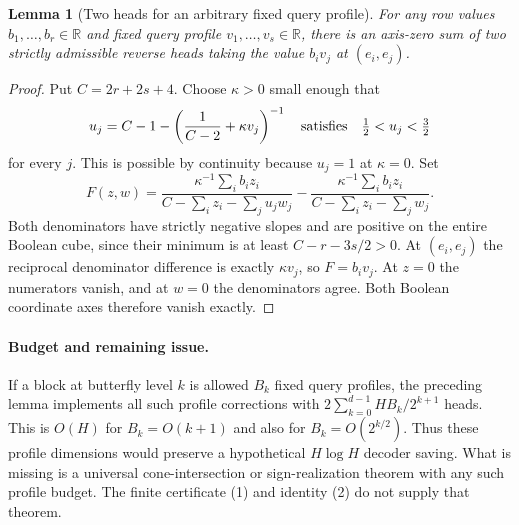 \documentclass[11pt]{article}
\newtheorem{lemma}{Lemma}
\begin{document}
\begin{lemma}[Two heads for an arbitrary fixed query profile]
For any row values $b_1,\ldots,b_r\in\mathbb R$ and fixed query profile
$v_1,\ldots,v_s\in\mathbb R$, there is an axis-zero sum of two
strictly admissible reverse heads taking the value $b_iv_j$ at
$(e_i,e_j)$.
\end{lemma}
\begin{proof}
Put $C=2r+2s+4$. Choose $\kappa>0$ small enough that
\[
 u_j=C-1-\left(\frac1{C-2}+\kappa v_j\right)^{-1}
 \quad\hbox{satisfies}\quad \tfrac12<u_j<\tfrac32
\]
for every $j$. This is possible by continuity because $u_j=1$ at
$\kappa=0$. Set
\[
 F(z,w)=\frac{\kappa^{-1}\sum_i b_iz_i}{C-\sum_i z_i-\sum_j u_jw_j}
       -\frac{\kappa^{-1}\sum_i b_iz_i}{C-\sum_i z_i-\sum_j w_j}.
\]
Both denominators have strictly negative slopes and are positive on the
entire Boolean cube, since their minimum is at least $C-r-3s/2>0$.
At $(e_i,e_j)$ the reciprocal denominator difference is exactly
$\kappa v_j$, so $F=b_iv_j$. At $z=0$ the numerators vanish, and at
$w=0$ the denominators agree. Both Boolean coordinate axes therefore
vanish exactly.
\end{proof}

\paragraph{Budget and remaining issue.}
If a block at butterfly level $k$ is allowed $B_k$ fixed query profiles,
the preceding lemma implements all such profile corrections with
$2\sum_{k=0}^{d-1}H B_k/2^{k+1}$ heads. This is $O(H)$ for
$B_k=O(k+1)$ and also for $B_k=O(2^{k/2})$.
Thus these profile dimensions would preserve a hypothetical
$H\log H$ decoder saving. What is missing is a universal cone-intersection
or sign-realization theorem with any such profile budget. The finite
certificate (1) and identity (2) do not supply that theorem.
\end{document}
